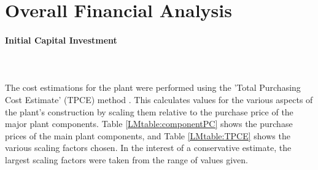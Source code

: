 

\let\subsection\paragraph
{} %

%

\section{Overall Financial Analysis}
\label{LMCostsection}

\subsection{Initial Capital Investment}\\
\hspace{1cm}\\
The cost estimations for the plant were performed using the 'Total Purchasing Cost Estimate' (TPCE) method \cite{KLM}. This calculates values for the various aspects of the plant's construction by scaling them relative to the purchase price of the major plant components. Table \ref{LMtable:componentPC} shows the purchase prices of the main plant components, and Table \ref{LMtable:TPCE} shows the various scaling factors chosen. In the interest of a conservative estimate, the largest scaling factors were taken from the range of values given.


